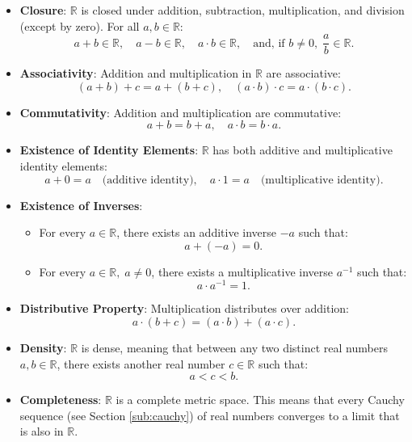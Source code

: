 \begin{itemize}
    \item \textbf{Closure}: \( \mathbb{R} \) is closed under addition, subtraction, multiplication, and division (except by zero). For all \( a, b \in \mathbb{R} \):
    \[
    a + b \in \mathbb{R}, \quad a - b \in \mathbb{R}, \quad a \cdot b \in \mathbb{R}, \quad \text{and, if } b \neq 0, \; \frac{a}{b} \in \mathbb{R}.
    \]
    
    \item \textbf{Associativity}: Addition and multiplication in \( \mathbb{R} \) are associative:
    \[
    (a + b) + c = a + (b + c), \quad (a \cdot b) \cdot c = a \cdot (b \cdot c).
    \]

    \item \textbf{Commutativity}: Addition and multiplication are commutative:
    \[
    a + b = b + a, \quad a \cdot b = b \cdot a.
    \]

    \item \textbf{Existence of Identity Elements}: \( \mathbb{R} \) has both additive and multiplicative identity elements:
    \[
    a + 0 = a \quad \text{(additive identity)}, \quad a \cdot 1 = a \quad \text{(multiplicative identity)}.
    \]

    \item \textbf{Existence of Inverses}:
    \begin{itemize}
        \item For every \( a \in \mathbb{R} \), there exists an additive inverse \( -a \) such that:
        \[
        a + (-a) = 0.
        \]
        \item For every \( a \in \mathbb{R}, \; a \neq 0 \), there exists a multiplicative inverse \( a^{-1} \) such that:
        \[
        a \cdot a^{-1} = 1.
        \]
    \end{itemize}

    \item \textbf{Distributive Property}: Multiplication distributes over addition:
    \[
    a \cdot (b + c) = (a \cdot b) + (a \cdot c).
    \]

    \item \textbf{Density}: \( \mathbb{R} \) is dense, meaning that between any two distinct real numbers \( a, b \in \mathbb{R} \), there exists another real number \( c \in \mathbb{R} \) such that:
    \[
    a < c < b.
    \]

    \item \textbf{Completeness}: \( \mathbb{R} \) is a complete metric space. This means that every Cauchy sequence (see Section \ref{sub:cauchy}) of real numbers converges to a limit that is also in \( \mathbb{R} \).


\end{itemize}

